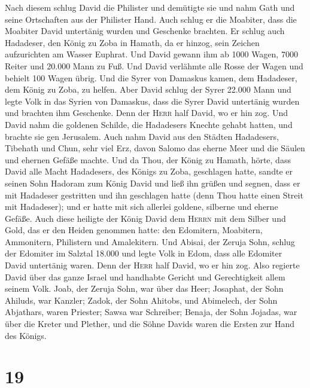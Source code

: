  Nach diesem schlug David die Philister und demütigte sie
und nahm Gath und seine Ortschaften aus der Philister Hand.
 Auch schlug er die Moabiter, dass die Moabiter David
untertänig wurden und Geschenke brachten.  Er schlug auch
Hadadeser, den König zu Zoba in Hamath, da er hinzog, sein Zeichen
aufzurichten am Wasser Euphrat.  Und David gewann ihm ab
1000 Wagen, 7000 Reiter und 20.000 Mann zu Fuß. Und David verlähmte alle
Rosse der Wagen und behielt 100 Wagen übrig.  Und die
Syrer von Damaskus kamen, dem Hadadeser, dem König zu Zoba, zu helfen.
Aber David schlug der Syrer 22.000 Mann  und legte Volk in
das Syrien von Damaskus, dass die Syrer David untertänig wurden und
brachten ihm Geschenke. Denn der \textsc{Herr} half David, wo er hin
zog.  Und David nahm die goldenen Schilde, die Hadadesers
Knechte gehabt hatten, und brachte sie gen Jerusalem. 
Auch nahm David aus den Städten Hadadesers, Tibehath und Chun, sehr viel
Erz, davon Salomo das eherne Meer und die Säulen und ehernen Gefäße
machte.  Und da Thou, der König zu Hamath, hörte, dass
David alle Macht Hadadesers, des Königs zu Zoba, geschlagen hatte,
 sandte er seinen Sohn Hadoram zum König David und ließ
ihn grüßen und segnen, dass er mit Hadadeser gestritten und ihn
geschlagen hatte (denn Thou hatte einen Streit mit Hadadeser); und er
hatte mit sich allerlei goldene, silberne und eherne Gefäße.
 Auch diese heiligte der König David dem \textsc{Herrn}
mit dem Silber und Gold, das er den Heiden genommen hatte: den
Edomitern, Moabitern, Ammonitern, Philistern und Amalekitern.
 Und Abisai, der Zeruja Sohn, schlug der Edomiter im
Salztal 18.000  und legte Volk in Edom, dass alle
Edomiter David untertänig waren. Denn der \textsc{Herr} half David, wo
er hin zog.  Also regierte David über das ganze Israel
und handhabte Gericht und Gerechtigkeit allem seinem Volk.
 Joab, der Zeruja Sohn, war über das Heer; Josaphat, der
Sohn Ahiluds, war Kanzler;  Zadok, der Sohn Ahitobs, und
Abimelech, der Sohn Abjathars, waren Priester; Sawsa war Schreiber;
 Benaja, der Sohn Jojadas, war über die Kreter und
Plether, und die Söhne Davids waren die Ersten zur Hand des Königs.

\hypertarget{section-18}{%
\section{19}\label{section-18}}

